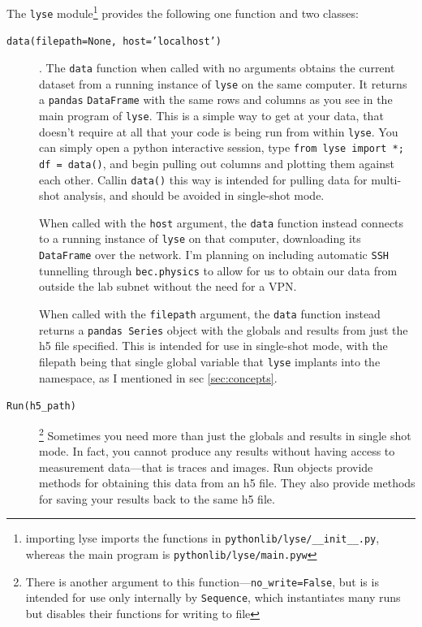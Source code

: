 \documentclass[a4paper,11pt,titlepage]{article}
\begin{document}
The \texttt{lyse} module\footnote{importing lyse imports the functions in \texttt{pythonlib/lyse/\_\_init\_\_.py}, whereas the main program is \texttt{pythonlib/lyse/main.pyw}} provides the following one function and two classes:
\begin{description}
\item[\texttt{data(filepath=None, host='localhost')}]. The \texttt{data} function when called with no arguments obtains the current dataset from a running instance of \texttt{lyse} on the same computer. It returns a \texttt{pandas} \texttt{DataFrame} with the same rows and columns as you see in the main program of \texttt{lyse}. This is a simple way to get at your data, that doesn't require at all that your code is being run from within \texttt{lyse}. You can simply open a python interactive session, type \texttt{from lyse import *; df = data()}, and begin pulling out columns and plotting them against each other. Callin \texttt{data()} this way is intended for pulling data for multi-shot analysis, and should be avoided in single-shot mode. 

When called with the \texttt{host} argument, the \texttt{data} function instead connects to a running instance of \texttt{lyse} on that computer, downloading its \texttt{DataFrame} over the network. I'm planning on including automatic \texttt{SSH} tunnelling through \texttt{bec.physics} to allow for us to obtain our data from outside the lab subnet without the need for a VPN.

When called with the \texttt{filepath} argument, the \texttt{data} function instead returns a \texttt{pandas Series} object with the globals and results from just the h5 file specified. This is intended for use in single-shot mode, with the filepath being that single global variable that \texttt{lyse} implants into the namespace, as I mentioned in sec \ref{sec:concepts}.

\item[\texttt{Run(h5\_path)}]\footnote{There is another argument to this function---\texttt{no\_write=False}, but is is intended for use only internally by \texttt{Sequence}, which instantiates many runs but disables their functions for writing to file} Sometimes you need more than just the globals and results in single shot mode. In fact, you cannot produce any results without having access to measurement data---that is traces and images. Run objects provide methods for obtaining this data from an h5 file. They also provide methods for saving your results back to the same h5 file. 


\end{description}
\end{document}
